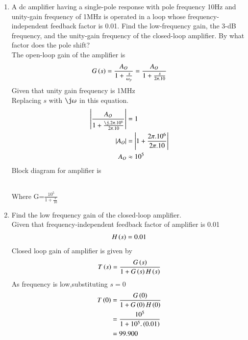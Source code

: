 \begin{enumerate}[label=\thesubsection.\arabic*.,ref=\thesubsection.\theenumi]

\item A dc amplifier having a single-pole response with pole frequency 10Hz and unity-gain frequency of 1MHz is operated in a loop whose frequency-independent feedback factor is 0.01. Find the low-frequency gain, the 3-dB frequency, and the unity-gain frequency of the closed-loop amplifier. By what factor does the pole shift?\\
\solution The open-loop gain of the amplifier is\\
\begin{align}
    G\left(s\right)=\frac{A_{O}}{1+\frac{s}{\omega_p}}=\frac{A_{O}}{1+\frac{s}{2\pi.10}}
\end{align}
Given that unity gain frequency is 1MHz\\
Replacing $s$ with $\j\omega$ in this equation.
\begin{align}
    \abs{\frac{A_{O}}{1+\frac{\j.2\pi.10^6}{2\pi.10}}}&=1\\
    \abs{A_{O}}&=\abs{1+\frac{2\pi.10^6}{2\pi.10}}\\
    A_{O}&\approx10^5
\end{align}
Block diagram for amplifier is
\begin{figure}[!ht]
    \begin{center}
		\resizebox{\columnwidth}{!}{}
	\end{center}
\caption{}
\label{fig:ee18btech11035_block}
\end{figure}\\
Where G=$\frac{10^5}{1+\frac{s}{10}}$

\item Find the low frequency gain of the closed-loop amplifier.\\ 
\solution Given that frequency-independent feedback factor of amplifier is 0.01\\
\begin{align}
    H\left(s\right)=0.01
\end{align}
Closed loop gain of amplifier is given by
\begin{align}
    \label{eq:ee18btech11035_T}
    T\left(s\right)=\frac{G\left(s\right)}{1+G\left(s\right)H\left(s\right)}
\end{align}
As frequency is low,substituting $s=0$\\
\begin{align}
    T\left(0\right)&=\frac{G\left(0\right)}{1+G\left(0\right)H\left(0\right)}\\
    &=\frac{10^5}{1+10^5.\left(0.01\right)}\\
    &=99.900
\end{align}


\end{enumerate}
